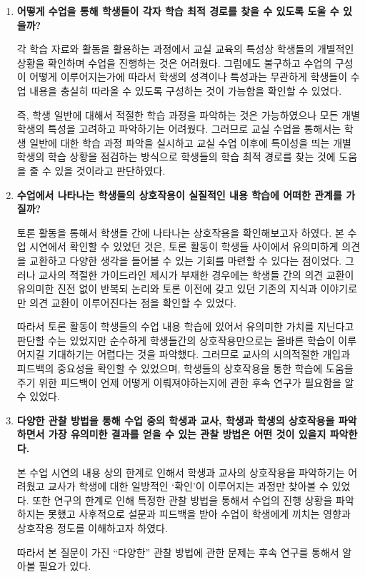 \documentclass[10pt, a4paper, chapter]{oblivoir}
\begin{document}
    \begin{enumerate}
        \item \textbf{어떻게 수업을 통해 학생들이 각자 학습 최적 경로를 찾을 수 있도록 도울 수 있을까?}
        
        각 학습 자료와 활동을 활용하는 과정에서 교실 교육의 특성상 학생들의 개별적인 상황을 확인하며
        수업을 진행하는 것은 어려웠다. 그럼에도 불구하고 수업의 구성이 어떻게 이루어지는가에 따라서 
        학생의 성격이나 특성과는 무관하게 학생들이 수업 내용을 충실히 따라올 수 있도록 구성하는 것이
        가능함을 확인할 수 있었다. 

        즉, 학생 일반에 대해서 적절한 학습 과정을 파악하는 것은 가능하였으나  모든 개별 학생의 특성을 고려하고
        파악하기는 어려웠다. 그러므로 교실 수업을 통해서는 학생 일반에 대한 학습 과정 파악을 실시하고 
       교실 수업 이후에 특이성을 띄는 개별 학생의 학습 상황을 점검하는 방식으로 학생들의 학습 최적 경로를 찾는 것에 도움을 줄 수  
	 있을 것이라고 판단하였다. 
        \item \textbf{수업에서 나타나는 학생들의 상호작용이 실질적인 내용 학습에 어떠한 관계를 가질까?}
        
        토론 활동을 통해서 학생들 간에 나타나는 상호작용을 확인해보고자 하였다. 본 수업 시연에서 
        확인할 수 있었던 것은, 토론 활동이 학생들 사이에서 유의미하게 의견을 교환하고 다양한 
        생각을 들어볼 수 있는 기회를 마련할 수 있다는 점이었다. 그러나 교사의 적절한 가이드라인
        제시가 부재한 경우에는 학생들 간의 의견 교환이 유의미한 진전 없이 반복되 논리와 토론 이전에 갖고 
        있던 기존의 지식과 이야기로만 의견 교환이 이루어진다는 점을 확인할 수 있었다. 

        따라서 토론 활동이 학생들의 수업 내용 학습에 있어서 유의미한 가치를 지닌다고 판단할 수는 
        있었지만 순수하게 학생들간의 상호작용만으로는 올바른 학습이 이루어지길 기대하기는 어렵다는 것을 파악했다. 
       그러므로 교사의 시의적절한 개입과 피드백의 중요성을 확인할 수 있었으며, 학생들의 상호작용을 통한 학습에 도움을 주기 위한 
       피드백이 언제 어떻게 이뤄져야하는지에 관한 후속 연구가 필요함을 알 수 있었다. 
        \item \textbf{다양한 관찰 방법을 통해 수업 중의 학생과 교사, 학생과 학생의 상호작용을 파악하면서 가장 유의미한 결과를 얻을 수 있는 관찰 방법은 어떤 것이 있을지 파악한다.}
        
        본 수업 시연의 내용 상의 한계로 인해서 학생과 교사의 상호작용을 파악하기는 어려웠고 교사가 학생에 대한 일방적인 `확인'이 이루어지는 과정만 찾아볼 수 있었다. 또한 
        연구의 한계로 인해 특정한 관찰 방법을 통해서 수업의 진행 상황을 파악하지는 못했고 사후적으로 설문과 피드백을 
        받아 수업이 학생에게 끼치는 영향과 상호작용 정도를 이해하고자 하였다. 

        따라서 본 질문이 가진 ``다양한'' 관찰 방법에 관한 문제는 후속 연구를 통해서 알아볼 필요가 있다. 
    \end{enumerate}
    
\end{document}
